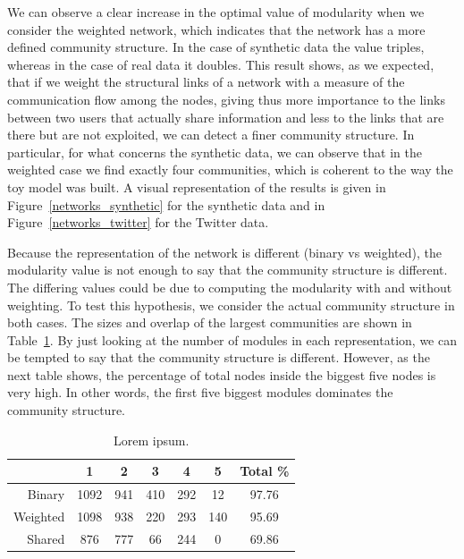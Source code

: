 \documentclass[12pt]{article}
\begin{document}
We can observe a clear increase in the optimal value of modularity when we consider the weighted network, which indicates that the network has a more
defined community structure. In the case of synthetic data the value triples, whereas in the case of real data it doubles. This result shows, as we expected,
that if we weight the structural links of a network with a measure of the communication flow among the nodes, giving thus more importance to the links
between two users that actually share information and less to the links that are there but are not exploited, we can detect a finer community structure.
In particular, for what concerns the synthetic data, we can observe that in the weighted case we find exactly four communities, which is coherent to the way
the toy model was built. A visual representation of the results is given in Figure~\ref{networks_synthetic} for the synthetic data and in 
Figure~\ref{networks_twitter} for the Twitter data.

Because the
representation of the network is different (binary vs weighted),
the modularity value is not enough to say that the community
structure is different. The differing values could be due to computing the modularity with and without weighting. To test this hypothesis, we consider the actual community structure in both cases. The sizes and overlap of the largest communities are shown in Table~\ref{Tab-Community_Stats}. By just looking at the number of modules in each representation,
we can be tempted to say that the community structure is different.
However, as the next table shows, the percentage of total nodes
inside the biggest five nodes is very high. In other words, the
first five biggest modules dominates the community structure.


\begin{table}
\begin{center}
\caption{Lorem ipsum.}
	\begin{tabular}{ | r | c | c | c | c | c | c |}
		\hline
		& 1 & 2 & 3 & 4 & 5 & Total \%\\ \hline
		Binary & 1092 & 941 & 410 & 292 & 12 & 97.76 \\ \hline
		Weighted & 1098 & 938 & 220 & 293 & 140 & 95.69 \\ \hline
		Shared & 876 & 777 & 66 & 244 & 0 & 69.86\label{Tab-Community_Stats} \\ \hline
		
	\end{tabular}
	\end{center}
\end{table}
\end{document}
